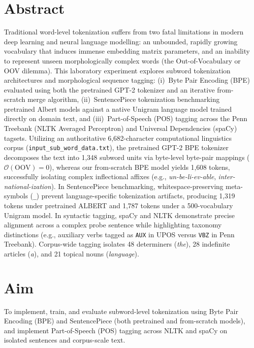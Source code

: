 \documentclass[12pt,a4paper]{report}
\begin{document}
\section{Abstract}
Traditional word-level tokenization suffers from two fatal limitations in modern deep learning and neural language modelling: an unbounded, rapidly growing vocabulary that induces immense embedding matrix parameters, and an inability to represent unseen morphologically complex words (the Out-of-Vocabulary or OOV dilemma). This laboratory experiment explores subword tokenization architectures and morphological sequence tagging: (i)~Byte Pair Encoding (BPE) evaluated using both the pretrained GPT-2 tokenizer and an iterative from-scratch merge algorithm, (ii)~SentencePiece tokenization benchmarking pretrained Albert models against a native Unigram language model trained directly on domain text, and (iii)~Part-of-Speech (POS) tagging across the Penn Treebank (NLTK Averaged Perceptron) and Universal Dependencies (spaCy) tagsets. Utilizing an authoritative 6,682-character computational linguistics corpus (\texttt{input\_sub\_word\_data.txt}), the pretrained GPT-2 BPE tokenizer decomposes the text into 1,348 subword units via byte-level byte-pair mappings ($\mathcal{O}(\text{OOV}) = 0$), whereas our from-scratch BPE model yields 1,608 tokens, successfully isolating complex inflectional affixes (e.g., \textit{un-be-li-ev-able}, \textit{inter-national-ization}). In SentencePiece benchmarking, whitespace-preserving meta-symbols (\texttt{\_}) prevent language-specific tokenization artifacts, producing 1,319 tokens under pretrained ALBERT and 1,787 tokens under a 500-vocabulary Unigram model. In syntactic tagging, spaCy and NLTK demonstrate precise alignment across a complex probe sentence while highlighting taxonomy distinctions (e.g., auxiliary verbs tagged as \texttt{AUX} in UPOS versus \texttt{VBZ} in Penn Treebank). Corpus-wide tagging isolates 48 determiners (\textit{the}), 28 indefinite articles (\textit{a}), and 21 topical nouns (\textit{language}).

\section{Aim}
To implement, train, and evaluate subword-level tokenization using Byte Pair Encoding (BPE) and SentencePiece (both pretrained and from-scratch models), and implement Part-of-Speech (POS) tagging across NLTK and spaCy on isolated sentences and corpus-scale text.
\end{document}
